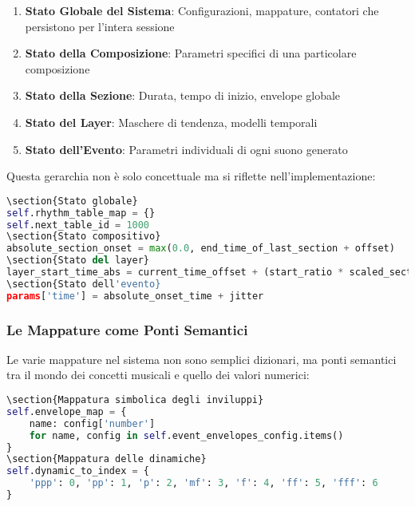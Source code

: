\begin{enumerate}
    \item \textbf{Stato Globale del Sistema}: Configurazioni, mappature, contatori che persistono per l'intera sessione
    \item \textbf{Stato della Composizione}: Parametri specifici di una particolare composizione
    \item \textbf{Stato della Sezione}: Durata, tempo di inizio, envelope globale
    \item \textbf{Stato del Layer}: Maschere di tendenza, modelli temporali
    \item \textbf{Stato dell'Evento}: Parametri individuali di ogni suono generato
\end{enumerate}
Questa gerarchia non è solo concettuale ma si riflette nell'implementazione:

\begin{lstlisting}[language=Python]
\section{Stato globale}
self.rhythm_table_map = {}
self.next_table_id = 1000
\section{Stato compositivo}
absolute_section_onset = max(0.0, end_time_of_last_section + offset)
\section{Stato del layer}
layer_start_time_abs = current_time_offset + (start_ratio * scaled_section_duration)
\section{Stato dell'evento}
params['time'] = absolute_onset_time + jitter
\end{lstlisting}
\subsubsection{Le Mappature come Ponti Semantici}
Le varie mappature nel sistema non sono semplici dizionari, ma ponti semantici tra il mondo dei concetti musicali e quello dei valori numerici:

\begin{lstlisting}[language=Python]
\section{Mappatura simbolica degli inviluppi}
self.envelope_map = {
    name: config['number'] 
    for name, config in self.event_envelopes_config.items()
}
\section{Mappatura delle dinamiche}
self.dynamic_to_index = {
    'ppp': 0, 'pp': 1, 'p': 2, 'mf': 3, 'f': 4, 'ff': 5, 'fff': 6
}
\end{lstlisting}

